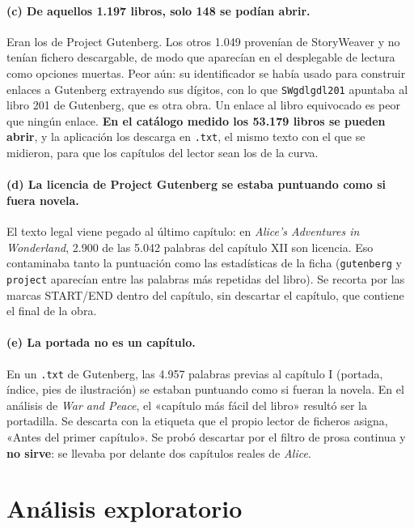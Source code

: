 \documentclass[11pt,a4paper]{article}
\newcommand{\cod}[1]{\texttt{\small #1}}
\begin{document}
\paragraph{(c) De aquellos 1.197 libros, solo 148 se podían abrir.} Eran los de Project
Gutenberg. Los otros 1.049 provenían de StoryWeaver y no tenían fichero descargable, de
modo que aparecían en el desplegable de lectura como opciones muertas. Peor aún: su
identificador se había usado para construir enlaces a Gutenberg extrayendo sus dígitos,
con lo que \cod{SWgdlgdl201} apuntaba al libro 201 de Gutenberg, que es otra obra. Un
enlace al libro equivocado es peor que ningún enlace. \textbf{En el catálogo medido los
53.179 libros se pueden abrir}, y la aplicación los descarga en \cod{.txt}, el mismo texto
con el que se midieron, para que los capítulos del lector sean los de la curva.

\paragraph{(d) La licencia de Project Gutenberg se estaba puntuando como si fuera
novela.} El texto legal viene pegado al último capítulo: en \emph{Alice's Adventures in
Wonderland}, 2.900 de las 5.042 palabras del capítulo XII son licencia. Eso contaminaba
tanto la puntuación como las estadísticas de la ficha (\cod{gutenberg} y \cod{project}
aparecían entre las palabras más repetidas del libro). Se recorta por las marcas
START/END dentro del capítulo, sin descartar el capítulo, que contiene el final de la
obra.

\paragraph{(e) La portada no es un capítulo.} En un \cod{.txt} de Gutenberg, las 4.957
palabras previas al capítulo I (portada, índice, pies de ilustración) se estaban
puntuando como si fueran la novela. En el análisis de \emph{War and Peace}, el «capítulo
más fácil del libro» resultó ser la portadilla. Se descarta con la etiqueta que el
propio lector de ficheros asigna, «Antes del primer capítulo». Se probó descartar por el
filtro de prosa continua y \textbf{no sirve}: se llevaba por delante dos capítulos reales
de \emph{Alice}.

\section{Análisis exploratorio}
\label{sec:eda}
\end{document}
